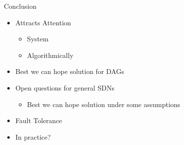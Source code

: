 \begin{frame}[<+->]{Conclusion}
\begin{itemize}
  	\item Attracts Attention 
	\begin{itemize}
	  \item System
	  \item Algorithmically
	\end{itemize}
  	\item Best we can hope solution for DAGs
  	\item Open questions for general SDNs
	\begin{itemize}
  		\item Best we can hope solution under some assumptions
	\end{itemize}
	\item Fault Tolerance
  	\item In practice? 
\end{itemize}
\end{frame}